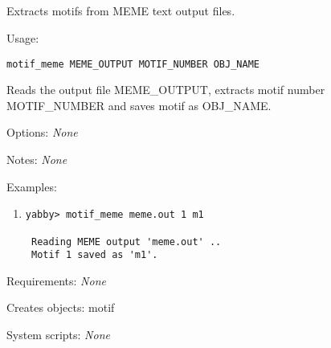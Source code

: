 

\subsection[motif\_meme]{  }



Extracts motifs from MEME text output files.


\begin{description}


\item{Usage:}

{\tt motif\_meme MEME\_OUTPUT MOTIF\_NUMBER OBJ\_NAME}

 Reads the output file MEME\_OUTPUT, extracts motif number
 MOTIF\_NUMBER and saves motif as OBJ\_NAME.


\item{Options:} {\em None}


\item{Notes:} {\em None}


\item{Examples:}
\begin{enumerate}

\item
\begin{verbatim}
yabby> motif_meme meme.out 1 m1

 Reading MEME output 'meme.out' ..
 Motif 1 saved as 'm1'.

\end{verbatim}

\end{enumerate}


\item{Requirements:} {\em None}


\item{Creates objects:} motif


\item{System scripts:} {\em None}

\end{description}

